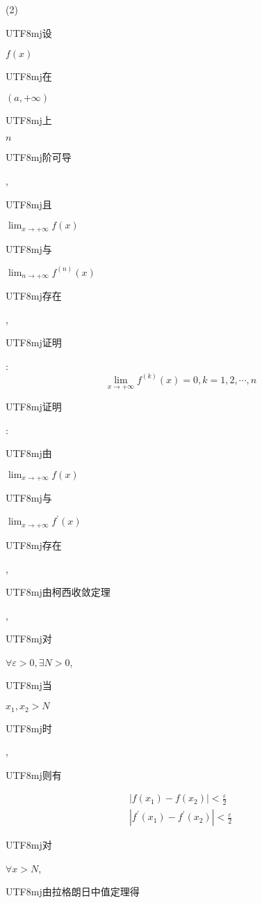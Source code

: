 \documentclass[10pt]{article}
\begin{document}
(2) \begin{CJK}{UTF8}{mj}设\end{CJK} $f(x)$ \begin{CJK}{UTF8}{mj}在\end{CJK} $(a,+\infty)$ \begin{CJK}{UTF8}{mj}上\end{CJK} $n$ \begin{CJK}{UTF8}{mj}阶可导\end{CJK}, \begin{CJK}{UTF8}{mj}且\end{CJK} $\lim _{x \rightarrow+\infty} f(x)$ \begin{CJK}{UTF8}{mj}与\end{CJK} $\lim _{n \rightarrow+\infty} f^{(n)}(x)$ \begin{CJK}{UTF8}{mj}存在\end{CJK}, \begin{CJK}{UTF8}{mj}证明\end{CJK}:
$$
\lim _{x \rightarrow+\infty} f^{(k)}(x)=0, k=1,2, \cdots, n
$$
\begin{CJK}{UTF8}{mj}证明\end{CJK}: \begin{CJK}{UTF8}{mj}由\end{CJK} $\lim _{x \rightarrow+\infty} f(x)$ \begin{CJK}{UTF8}{mj}与\end{CJK} $\lim _{x \rightarrow+\infty} f^{\prime}(x)$ \begin{CJK}{UTF8}{mj}存在\end{CJK}, \begin{CJK}{UTF8}{mj}由柯西收敛定理\end{CJK}, \begin{CJK}{UTF8}{mj}对\end{CJK} $\forall \varepsilon>0, \exists N>0$, \begin{CJK}{UTF8}{mj}当\end{CJK} $x_{1}, x_{2}>N$ \begin{CJK}{UTF8}{mj}时\end{CJK}, \begin{CJK}{UTF8}{mj}则有\end{CJK}
$$
\begin{gathered}
\left|f\left(x_{1}\right)-f\left(x_{2}\right)\right|<\frac{\varepsilon}{2} \\
\left|f^{\prime}\left(x_{1}\right)-f^{\prime}\left(x_{2}\right)\right|<\frac{\varepsilon}{2}
\end{gathered}
$$
\begin{CJK}{UTF8}{mj}对\end{CJK} $\forall x>N$, \begin{CJK}{UTF8}{mj}由拉格朗日中值定理得\end{CJK}
\end{document}
